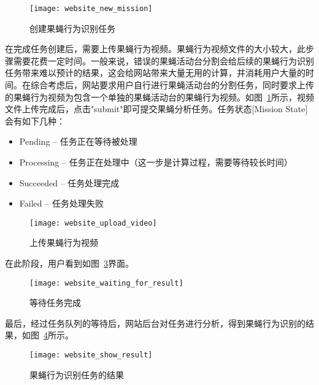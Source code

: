 \begin{figure}
\centering
\texttt{[image: website\_new\_mission]}
\caption{创建果蝇行为识别任务}
\label{fig:website_new_mission}
\end{figure}

在完成任务创建后，需要上传果蝇行为视频。果蝇行为视频文件的大小较大，此步骤需要花费一定时间。一般来说，错误的果蝇活动台分割会给后续的果蝇行为识别任务带来难以预计的结果，这会给网站带来大量无用的计算，并消耗用户大量的时间。在综合考虑后，网站要求用户自行进行果蝇活动台的分割任务，同时要求上传的果蝇行为视频为包含一个单独的果蝇活动台的果蝇行为视频。如图~\ref{fig:website_new_mission}所示，视频文件上传完成后，点击"submit"即可提交果蝇分析任务。任务状态[Mission State]会有如下几种：
\begin{itemize}
\item Pending – 任务正在等待被处理
\item Processing – 任务正在处理中（这一步是计算过程，需要等待较长时间）
\item Succeeded – 任务处理完成
\item Failed – 任务处理失败
\end{itemize}

\begin{figure}
\centering
\texttt{[image: website\_upload\_video]}
\caption{上传果蝇行为视频}
\label{fig:website_upload_video}
\end{figure}

在此阶段，用户看到如图~\ref{fig:website_waiting_for_result}界面。

\begin{figure}
\centering
\texttt{[image: website\_waiting\_for\_result]}
\caption{等待任务完成}
\label{fig:website_waiting_for_result}
\end{figure}

最后，经过任务队列的等待后，网站后台对任务进行分析，得到果蝇行为识别的结果，如图~\ref{fig:website_show_result}所示。

\begin{figure}
\centering
\texttt{[image: website\_show\_result]}
\caption{果蝇行为识别任务的结果}
\label{fig:website_show_result}
\end{figure}

